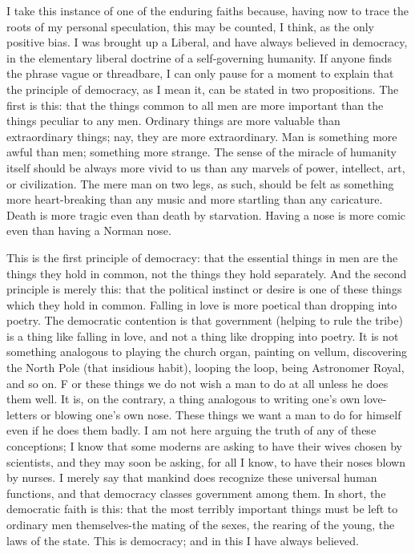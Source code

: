 \documentclass{book}
\begin{document}
I take this instance of one of the enduring faiths because, having now to trace the roots of my personal speculation, this may be counted, I think, as the only positive bias. I was brought up a Liberal, and have always believed in democracy, in the elementary liberal doctrine of a self-governing humanity. If anyone finds the phrase vague or threadbare, I can only pause for a moment to explain that the principle of democracy, as I mean it, can be stated in two propositions. The first is this: that the things common to all men are more important than the things peculiar to any men. Ordinary things are more valuable than extraordinary things; nay, they are more extraordinary. Man is something more awful than men; something more strange. The sense of the miracle of humanity itself should be always more vivid to us than any marvels of power, intellect, art, or civilization. The mere man on two legs, as such, should be felt as something more heart-breaking than any music and more startling than any caricature. Death is more tragic even than death by starvation. Having a nose is more comic even than having a Norman nose.

This is the first principle of democracy: that the essential things in men are the things they hold in common, not the things they hold separately. And the second principle is merely this: that the political instinct or desire is one of these things which they hold in common. Falling in love is more poetical than dropping into poetry. The democratic contention is that government (helping to rule the tribe) is a thing like falling in love, and not a thing like dropping into poetry. It is not something analogous to playing the church organ, painting on vellum, discovering the North Pole (that insidious habit), looping the loop, being Astronomer Royal, and so on. F or these things we do not wish a man to do at all unless he does them well. It is, on the contrary, a thing analogous to writing one’s own love-letters or blowing one’s own nose. These things we want a man to do for himself even if he does them badly. I am not here arguing the truth of any of these conceptions; I know that some moderns are asking to have their wives chosen by scientists, and they may soon be asking, for all I know, to have their noses blown by nurses. I merely say that mankind does recognize these universal human functions, and that democracy classes government among them. In short, the democratic faith is this: that the most terribly important things must be left to ordinary men themselves-the mating of the sexes, the rearing of the young, the laws of the state. This is democracy; and in this I have always believed.
\end{document}
